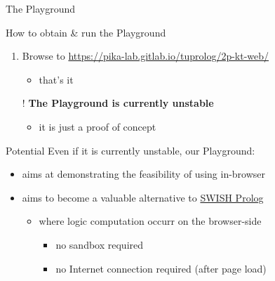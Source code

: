 \documentclass[handout]{beamer}
\begin{document}
\begin{frame}[allowframebreaks]{The Playground}
    \begin{block}{How to obtain \& run the Playground}
        \begin{enumerate}
            \item Browse to \url{https://pika-lab.gitlab.io/tuprolog/2p-kt-web/}
            \begin{itemize}
                \item that's it
            \end{itemize}

            \item[!] \textbf{The Playground is currently unstable}
            \begin{itemize}
                \item it is just a proof of concept
            \end{itemize} 
        \end{enumerate}
    \end{block}

    \begin{alertblock}{Potential}
        Even if it is currently unstable, our Playground:
        \begin{itemize}
            \item aims at demonstrating the feasibility of using \twopkt{} \alert{in-browser}
            \item aims to become a valuable alternative to \href{https://swish.swi-prolog.org}{SWISH Prolog}
            \begin{itemize}
                \item where logic computation occurr on the \alert{browser-side}
                \begin{itemize}
                    \item no sandbox required
                    \item no Internet connection required (after page load)
                \end{itemize}
            \end{itemize}
        \end{itemize}
    \end{alertblock}

    \framebreak


\end{frame}
\end{document}
